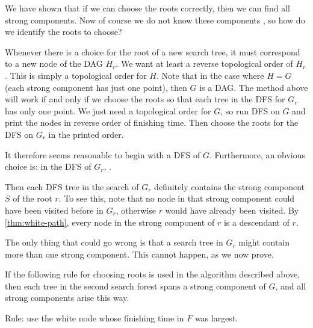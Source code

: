 We have shown that if we can choose the roots correctly, then we can
find all strong components. Now of course we do not know these components
, so how do we identify the roots to choose?

Whenever there is a choice for the root of a new search tree, it must
correspond to a new node of the DAG $H_r$. We want at least a reverse
topological order of $H_r$. This is simply a topological order for
$H$. Note that in the case where $H=G$ (each strong component has just
one point), then $G$ is a DAG. The method above will work if and only
if we choose the roots so that each tree in the DFS for $G_r$ has only
one point. We just need a topological order for $G$, so run DFS on $G$
and print the nodes in reverse order of finishing time. Then choose the
roots for the DFS on $G_r$ in the printed order.

It therefore seems reasonable to begin with a DFS of $G$. Furthermore,
an obvious choice is: in the DFS of $G_r$, .

Then each DFS tree in the search of $G_r$ definitely contains the strong
component $S$ of the root $r$. To see this, note that no node in that
strong component could have been visited before in $G_r$, otherwise $r$
would have already been visited. By \cref{thm:white-path}, every
node in the strong component of $r$ is a descendant of $r$.

The only thing that could go wrong is that a search tree in $G_r$
might contain more than one strong component. This cannot happen,
as we now prove.

\begin{Theorem} \label{thm:scc-alg} 
If the following rule for choosing roots is used in the algorithm
described above, then each tree in the second search forest spans a
strong component of $G$, and all strong components arise this way.

Rule: use the white node whose finishing time in $F$ was largest.
\end{Theorem}

%

